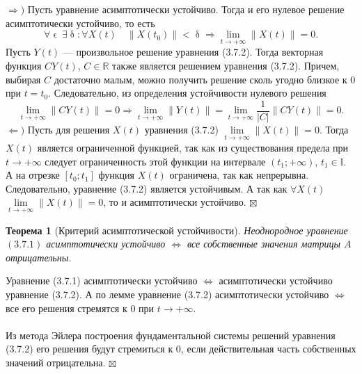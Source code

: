 \documentclass[a4paper, 12pt]{report}
\newenvironment{Proof} %
{\par\noindent{$\blacklozenge$}} %
{\hfill$\scriptstyle\boxtimes$}
\newcommand{\Rm}{\mathbb{R}}
\newcommand{\I}{\mathbb{I}}
\renewcommand{\delta}{\updelta}
\renewcommand{\epsilon}{\upvarepsilon}
\newcommand\Norm[1]{\left\| #1 \right\|}
\newtheorem*{theorem}{Теорема}
\begin{document}
\begin{Proof}
	$\Rightarrow)$ Пусть уравнение асимптотически устойчиво. Тогда и его нулевое решение асимптотически устойчиво, то есть $$\forall \epsilon\ \exists \delta : \forall X(t) \quad \Norm{X(t_0)} < \delta \Rightarrow \lim\limits_{t\to +\infty} \Norm{X(t)} = 0.$$
	Пусть $Y(t)$ --- произвольное решение уравнения (3.7.2). Тогда векторная функция $CY(t)$, $C \in \Rm$ также является решением уравнения (3.7.2). Причем, выбирая $C$ достаточно малым, можно получить решение сколь угодно близкое к 0 при $t = t_0$. Следовательно, из определения устойчивости нулевого решения $$\lim\limits_{t\to +\infty} \Norm{CY(t)} = 0 \Rightarrow \lim\limits_{t\to +\infty} \Norm{Y(t)} = \lim\limits_{t\to +\infty} \dfrac{1}{|C|}\Norm{CY(t)} =0 .$$
	$\Leftarrow)$ Пусть для решения $X(t)$ уравнения (3.7.2) $\lim\limits_{t\to +\infty} \Norm{X(t)} = 0$. Тогда $X(t)$ является ограниченной функцией, так как из существования предела при $t\to +\infty$ следует ограниченность этой функции на интервале $(t_1; +\infty)$, $t_1 \in \I$. А на отрезке $[t_0; t_1]$ функция $X(t)$ ограничена, так как непрерывна. Следовательно, уравнение (3.7.2) является устойчивым. А так как $\forall X(t)$ $\lim\limits_{t\to +\infty} \Norm{X(t)} = 0$, то и асимптотически устойчиво.
\end{Proof}
\begin{theorem}
	[Критерий асимптотической устойчивости]
	Неоднородное уравнение $(3.7.1)$ асимптотически устойчиво $\Longleftrightarrow$ все собственные значения матрицы $A$ отрицательны.
\end{theorem}
\begin{Proof}
	Уравнение (3.7.1) асимптотически устойчиво $\Longleftrightarrow$ асимптотически устойчиво уравнение (3.7.2). А по лемме уравнение (3.7.2) асимптотически устойчиво $\Longleftrightarrow$ все его решения стремятся к 0 при $t\to+\infty$.\\\\
	Из метода Эйлера построения фундаментальной системы решений уравнения (3.7.2) его решения будут стремиться к 0, если действительная часть собственных значений отрицательна.
\end{Proof}
\end{document}
